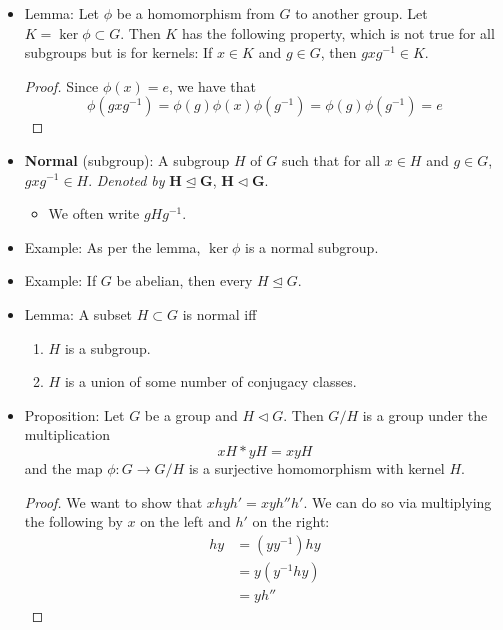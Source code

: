 \documentclass[../notes.tex]{subfiles}
\begin{document}
\begin{itemize}
\begin{itemize}
    \end{itemize}
    \item Lemma: Let $\phi$ be a homomorphism from $G$ to another group. Let $K=\ker\phi\subset G$. Then $K$ has the following property, which is not true for all subgroups but is for kernels: If $x\in K$ and $g\in G$, then $gxg^{-1}\in K$.
    \begin{proof}
        Since $\phi(x)=e$, we have that
        \begin{equation*}
            \phi(gxg^{-1}) = \phi(g)\phi(x)\phi(g^{-1})
            = \phi(g)\phi(g^{-1})
            = e
        \end{equation*}
    \end{proof}
    \item \textbf{Normal} (subgroup): A subgroup $H$ of $G$ such that for all $x\in H$ and $g\in G$, $gxg^{-1}\in H$. \emph{Denoted by} $\bm{H\trianglelefteq G}$, $\bm{H\triangleleft G}$.
    \begin{itemize}
        \item We often write $gHg^{-1}$.
    \end{itemize}
    \item Example: As per the lemma, $\ker\phi$ is a normal subgroup.
    \item Example: If $G$ be abelian, then every $H\trianglelefteq G$.
    \item Lemma: A subset $H\subset G$ is normal iff
    \begin{enumerate}
        \item $H$ is a subgroup.
        \item $H$ is a union of some number of conjugacy classes.
    \end{enumerate}
    \item Proposition: Let $G$ be a group and $H\triangleleft G$. Then $G/H$ is a group under the multiplication
    \begin{equation*}
        xH*yH = xyH
    \end{equation*}
    and the map $\phi:G\to G/H$ is a surjective homomorphism with kernel $H$.
    \begin{proof}
        We want to show that $xhyh'=xyh''h'$. We can do so via multiplying the following by $x$ on the left and $h'$ on the right:
        \begin{align*}
            hy &= (yy^{-1})hy\\
            &= y(y^{-1}hy)\\
            &= yh''
        \end{align*}

\end{proof}
\end{itemize}
\end{document}
